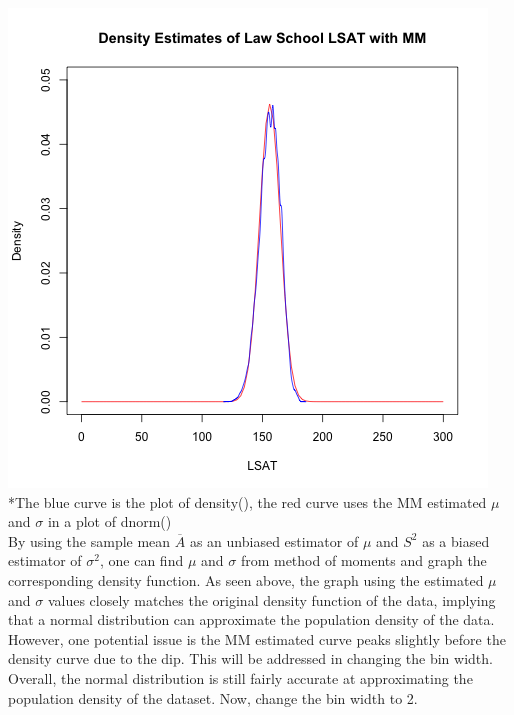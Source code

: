 \documentclass[12pt, letterpaper]{article}
\begin{document}
\includegraphics[scale=0.85]{Lawschool_LSAT_Density_mm} \\
\footnotesize
\**The blue curve is the plot of density(), the red curve uses the MM estimated $\mu$ and $\sigma$ in a plot of dnorm() \\
\normalsize
By using the sample mean $\overline{A}$ as an unbiased estimator of $\mu$ and $S^2$ as a biased estimator of $\sigma^2$, one can find $\mu$ and $\sigma$ from method of moments and graph the corresponding density function. As seen above, the graph using the estimated $\mu$ and $\sigma$ values closely matches the original density function of the data, implying that a normal distribution can approximate the population density of the data. However, one potential issue is the MM estimated curve peaks slightly before the density curve due to the dip. This will be addressed in changing the bin width. Overall, the normal distribution is still fairly accurate at approximating the population density of the dataset. Now, change the bin width to 2.   \\
\end{document}
